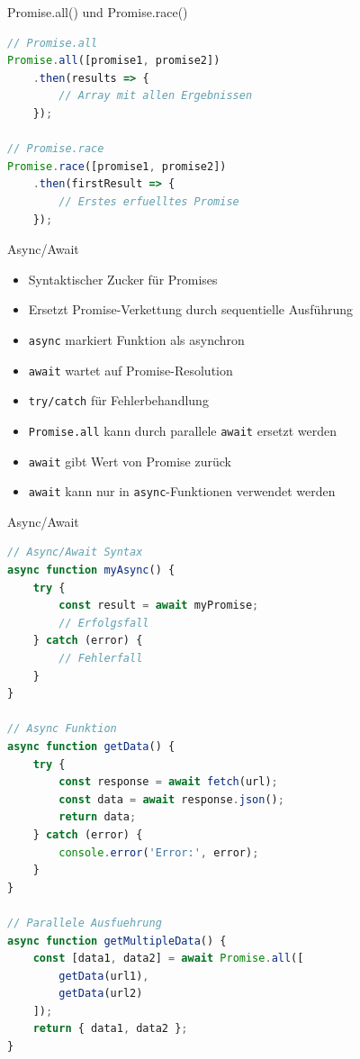 \begin{KR}{Promise.all() und Promise.race()}
\begin{lstlisting}[language=JavaScript, style=basesmol]
// Promise.all
Promise.all([promise1, promise2])
    .then(results => {
        // Array mit allen Ergebnissen
    });

// Promise.race
Promise.race([promise1, promise2])
    .then(firstResult => {
        // Erstes erfuelltes Promise
    });
\end{lstlisting}
\end{KR}

\begin{definition}{Async/Await}
\begin{itemize}
  \item Syntaktischer Zucker für Promises
  \item Ersetzt Promise-Verkettung durch sequentielle Ausführung
  \item \texttt{async} markiert Funktion als asynchron
  \item \texttt{await} wartet auf Promise-Resolution
  \item \texttt{try/catch} für Fehlerbehandlung
  \item \texttt{Promise.all} kann durch parallele \texttt{await} ersetzt werden
  \item \texttt{await} gibt Wert von Promise zurück
  \item \texttt{await} kann nur in \texttt{async}-Funktionen verwendet werden
\end{itemize}
\end{definition}

\begin{KR}{Async/Await}
\begin{lstlisting}[language=JavaScript, style=basesmol]
// Async/Await Syntax
async function myAsync() {
    try {
        const result = await myPromise;
        // Erfolgsfall
    } catch (error) {
        // Fehlerfall
    }
}

// Async Funktion
async function getData() {
    try {
        const response = await fetch(url);
        const data = await response.json();
        return data;
    } catch (error) {
        console.error('Error:', error);
    }
}

// Parallele Ausfuehrung
async function getMultipleData() {
    const [data1, data2] = await Promise.all([
        getData(url1),
        getData(url2)
    ]);
    return { data1, data2 };
}
\end{lstlisting}
\end{KR}

